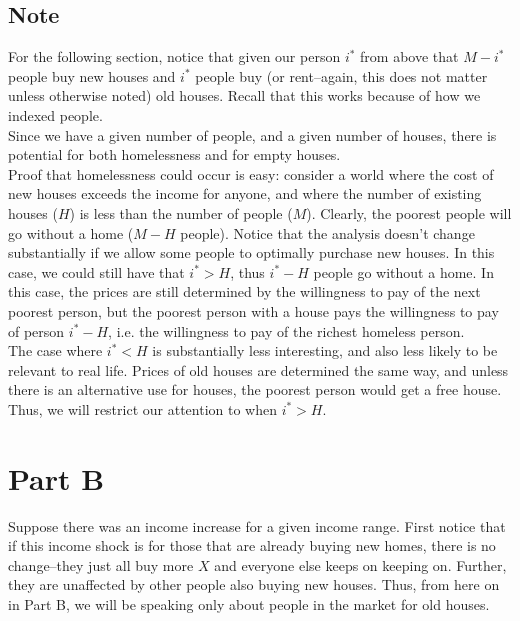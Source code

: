 \documentclass[12pt]{paper}
\begin{document}
\subsection*{Note}


For the following section, notice that given our person $i^*$ from above that $M-i^*$ people buy new houses and $i^*$ people buy (or rent--again, this does not matter unless otherwise noted) old houses. Recall that this works because of how we indexed people.\\


Since we have a given number of people, and a given number of houses, there is potential for both homelessness and for empty houses.\\


Proof that homelessness could occur is easy: consider a world where the cost of new houses exceeds the income for anyone, and where the number of existing houses ($H$) is less than the number of people ($M$). Clearly, the poorest people will go without a home ($M-H$ people). Notice that the analysis doesn't change substantially if we allow some people to optimally purchase new houses. In this case, we could still have that $i^*>H$, thus $i^*-H$ people go without a home. In this case, the prices are still determined by the willingness to pay of the next poorest person, but the poorest person with a house pays the willingness to pay of person $i^*-H$, i.e. the willingness to pay of the richest homeless person.\\


The case where $i^*<H$ is substantially less interesting, and also less likely to be relevant to real life. Prices of old houses are determined the same way, and unless there is an alternative use for houses, the poorest person would get a free house. Thus, we will restrict our attention to when $i^*>H$.\\


\section*{Part B}


Suppose there was an income increase for a given income range. First notice that if this income shock is for those that are already buying new homes, there is no change--they just all buy more $X$ and everyone else keeps on keeping on. Further, they are unaffected by other people also buying new houses. Thus, from here on in Part B, we will be speaking only about people in the market for old houses.\\
\end{document}
